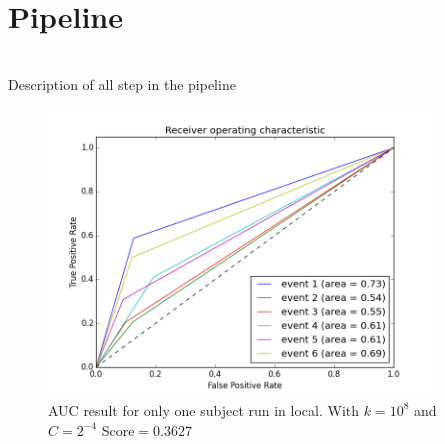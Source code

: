 \documentclass[]{article}
\begin{document}
\section{Pipeline}
%
\raisebox{-4ex}{$\to$}%
%
\raisebox{-4ex}{$\to$}%
\raisebox{-4ex}{$\to$}%
\\
Description of all step in the pipeline


\begin{center}
\begin{figure}\caption{AUC result for only one subject run in local. With $k=10^8$ and $C=2^{-4}$ Score$=0.3627$}
\includegraphics[height=3.0in]{plots/oneSubjectAUC.png}
\end{figure}
\end{center}
\end{document}
